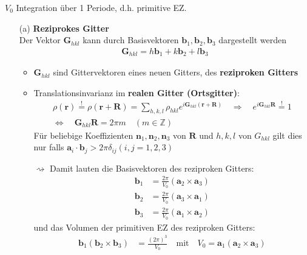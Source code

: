 $V_0$ Integration über 1 Periode, d.h. primitive EZ.
\begin{itemize}
    \item[(a)] \textbf{Reziprokes Gitter}\\
          Der Vektor $\textbf{G}_{hkl}$ kann durch Basisvektoren $\textbf{b}_1, \textbf{b}_2, \textbf{b}_3$ dargestellt werden
          \begin{align*}
              \textbf{G}_{hkl} = h \textbf{b}_1 + k \textbf{b}_2 + l \textbf{b}_3
          \end{align*}
          \begin{itemize}
              \item $\textbf{G}_{hkl}$ sind Gittervektoren eines neuen Gitters, des \textbf{reziproken Gitters}
              \item Translationsinvarianz im \textbf{realen Gitter (Ortsgitter)}:
                    \begin{align*}
                        \rho(\textbf{r})  \overset{!}{=}  \rho(\textbf{r} + \textbf{R}) = \sum_{h,k,l} \rho_{hkl} e^{i \textbf{G}_{hkl} (\textbf{r}+\textbf{R})} \quad \Rightarrow \quad e^{i \textbf{G}_{hkl} \textbf{R}} \overset{!}{=} 1 \\
                        \Leftrightarrow \quad \textbf{G}_{hkl} \textbf{R} = 2 \pi m \quad (m \in \mathbb{Z})
                    \end{align*}
                    Für beliebige Koeffizienten $ \textbf{n}_1, \textbf{n}_2, \textbf{n}_3$ von $\textbf{R}$ und $h,k,l$ von $G_{hkl}$ gilt dies nur  falls $\textbf{a}_i\cdot \textbf{b}_j > 2\pi \delta_{ij} (i,j = 1,2,3)$
                \item[$\rightsquigarrow$] Damit lauten die Basisvektoren des reziproken Gitters:
                \begin{align*}
                    \textbf{b}_1 &= \frac{2 \pi}{V_0} ( \textbf{a}_2 \times \textbf{a}_3)\\
                    \textbf{b}_2 &= \frac{2 \pi}{V_0} ( \textbf{a}_3 \times \textbf{a}_1)\\
                    \textbf{b}_3 &= \frac{2 \pi}{V_0} ( \textbf{a}_1 \times \textbf{a}_2)
                \end{align*}
                und das Volumen der primitiven EZ des reziproken Gitters:
                \begin{align*}
                    \textbf{b}_1 ( \textbf{b}_2 \times \textbf{b}_3) &= \frac{(2 \pi)^3}{V_0} \quad \text{mit} \quad V_0 = \textbf{a}_1 ( \textbf{a}_2 \times \textbf{a}_3)

\end{align*}
\end{itemize}
\end{itemize}
